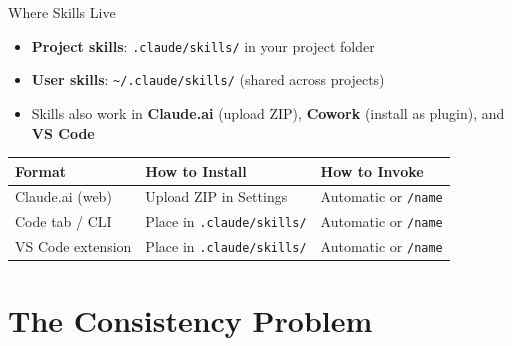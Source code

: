 \documentclass[aspectratio=169]{beamer}
\begin{document}
\begin{frame}{Where Skills Live}
\begin{itemize}
  \item \textbf{Project skills}: \texttt{.claude/skills/} in your project folder
  \item \textbf{User skills}: \texttt{\textasciitilde/.claude/skills/} (shared across projects)
  \item Skills also work in \textbf{Claude.ai} (upload ZIP), \textbf{Cowork} (install as plugin), and \textbf{VS Code}
\end{itemize}
\vspace{0.3cm}
\begin{center}
\small
\begin{tabular}{@{} l l l @{}}
\toprule
\textbf{Format} & \textbf{How to Install} & \textbf{How to Invoke} \\
\midrule
Claude.ai (web) & Upload ZIP in Settings & Automatic or \texttt{/name} \\
Code tab / CLI & Place in \texttt{.claude/skills/} & Automatic or \texttt{/name} \\
VS Code extension & Place in \texttt{.claude/skills/} & Automatic or \texttt{/name} \\
\bottomrule
\end{tabular}
\end{center}
\end{frame}

\section{The Consistency Problem}
\end{document}
